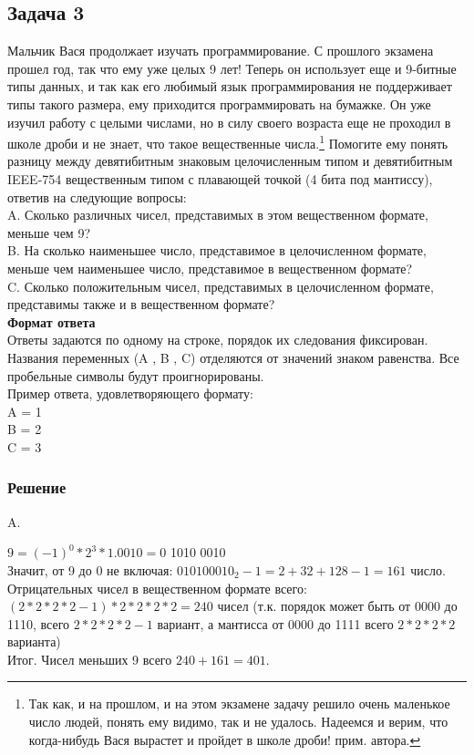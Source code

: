 \documentclass[12pt, letterpaper]{article}
\begin{document}
\subsection{Задача 3}
Мальчик Вася продолжает изучать программирование. С прошлого экзамена прошел год, так что ему уже целых 9 лет! Теперь он использует еще и 9-битные типы данных, и так как его любимый язык  программирования не поддерживает типы такого размера, ему приходится программировать на бумажке. Он уже изучил работу с целыми числами, но в силу своего возраста еще не проходил в школе дроби и не знает, что такое вещественные числа.\footnote{Так как, и на прошлом, и на этом экзамене задачу решило очень маленькое число людей, понять ему видимо, так и не удалось. Надеемся и верим, что когда-нибудь Вася вырастет и пройдет в школе дроби! прим. автора.} Помогите ему понять разницу между девятибитным знаковым целочисленным типом и девятибитным IEEE-754 вещественным типом с плавающей точкой (4 бита под мантиссу), ответив на следующие вопросы:\\

A. Сколько различных чисел, представимых в этом вещественном формате, меньше чем 9?\\

B. На сколько наименьшее число, представимое в целочисленном формате, меньше чем наименьшее число, представимое в вещественном формате?\\

C. Сколько положительным чисел, представимых в целочисленном формате, представимы также и в вещественном формате?\\

\textbf{Формат ответа}\\
Ответы задаются по одному на строке, порядок их следования фиксирован. Названия переменных (A , B , C) отделяются от значений знаком равенства. Все пробельные символы будут проигнорированы.\\

Пример ответа, удовлетворяющего формату:\\
A = 1\\
B = 2\\
C = 3
\newpage
\subsubsection{Решение}
\noindent A.

\setlength{\leftskip}{1cm}
\noindent$9 = (-1)^0 * 2^3 *1.0010 = $0 1010 0010\\
Значит, от 9 до 0 не включая: $010100010_2 - 1 = 2 + 32 + 128 - 1 = 161$ число.\\
Отрицательных чисел в вещественном формате всего:\\
$(2*2*2*2 - 1) * 2*2*2*2 = 240$ чисел (т.к. порядок может быть от 0000 до 1110, всего $2*2*2*2-1$ вариант, а мантисса от 0000 до 1111 всего $2*2*2*2$ варианта)\\
Итог. Чисел меньших 9 всего $240 + 161 = 401$.\\
\end{document}
